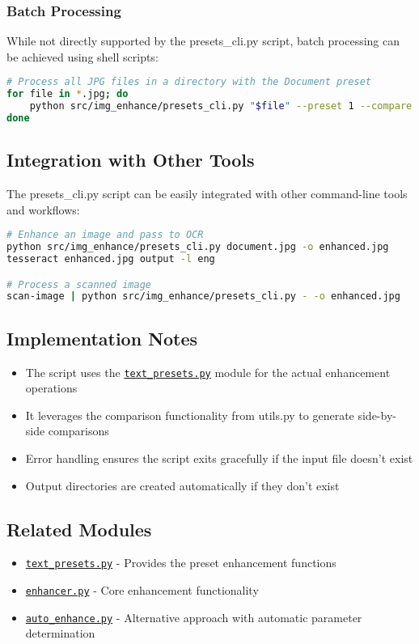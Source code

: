 \subsubsection{Batch Processing}
While not directly supported by the presets\_cli.py script, batch processing can be achieved using shell scripts:

\begin{lstlisting}[language=Bash, caption=Batch Processing Example]
# Process all JPG files in a directory with the Document preset
for file in *.jpg; do
    python src/img_enhance/presets_cli.py "$file" --preset 1 --compare
done
\end{lstlisting}

\subsection{Integration with Other Tools}
The presets\_cli.py script can be easily integrated with other command-line tools and workflows:

\begin{lstlisting}[language=Bash, caption=Integration Example]
# Enhance an image and pass to OCR
python src/img_enhance/presets_cli.py document.jpg -o enhanced.jpg
tesseract enhanced.jpg output -l eng

# Process a scanned image
scan-image | python src/img_enhance/presets_cli.py - -o enhanced.jpg
\end{lstlisting}

\subsection{Implementation Notes}
\begin{itemize}
    \item The script uses the \hyperref[sec:text_presets]{\texttt{text\_presets.py}} module for the actual enhancement operations
    \item It leverages the comparison functionality from utils.py to generate side-by-side comparisons
    \item Error handling ensures the script exits gracefully if the input file doesn't exist
    \item Output directories are created automatically if they don't exist
\end{itemize}

\subsection{Related Modules}
\begin{itemize}
    \item \hyperref[sec:text_presets]{\texttt{text\_presets.py}} - Provides the preset enhancement functions
    \item \hyperref[sec:enhancer]{\texttt{enhancer.py}} - Core enhancement functionality
    \item \hyperref[sec:auto_enhance]{\texttt{auto\_enhance.py}} - Alternative approach with automatic parameter determination
\end{itemize} 
